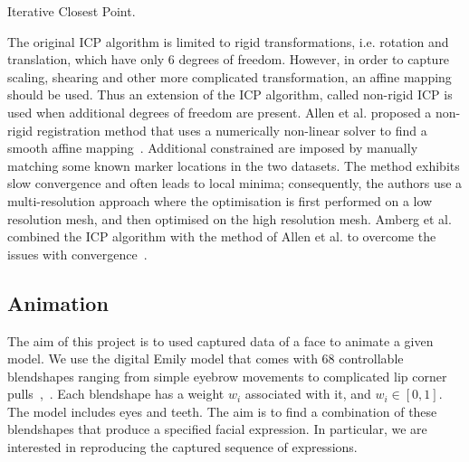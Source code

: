 \begin{algorithm}[H]   \caption{Iterative Closest Point.}
\BlankLine
{}
 \label{alg:icp}
\end{algorithm} 
The original ICP algorithm is limited to rigid transformations, i.e. rotation and translation, which have only $6$ degrees of freedom. However, in order to capture scaling, shearing and other more complicated transformation, an affine mapping should be used. Thus an extension of the ICP algorithm, called non-rigid ICP is used when additional degrees of freedom are present. Allen et al. proposed a non-rigid registration method that uses a numerically non-linear solver to find a smooth affine mapping~\cite{Allen:2003}. Additional constrained are imposed by manually matching some known marker locations in the two datasets. The method exhibits slow convergence and often leads to local minima; consequently, the authors use a multi-resolution approach where the optimisation is first performed on a low resolution mesh, and then optimised on the high resolution mesh. Amberg et al. combined the ICP algorithm with the method of Allen et al. to overcome the issues with convergence~\cite{Amberg:2007}.

\subsection{Animation}
The aim of this project is to used captured data of a face to animate a given model. We use the digital Emily model that comes with $68$ controllable blendshapes ranging from simple eyebrow movements to complicated lip corner pulls~\cite{Alexander:2009},~\cite{FaceWareRigsWeb}. Each blendshape has a weight $w_i$ associated with it, and $w_i \in [0,1]$. The model includes eyes and teeth. The aim is to find a combination of these blendshapes that produce a specified facial expression. In particular, we are interested in reproducing the captured sequence of expressions. 


